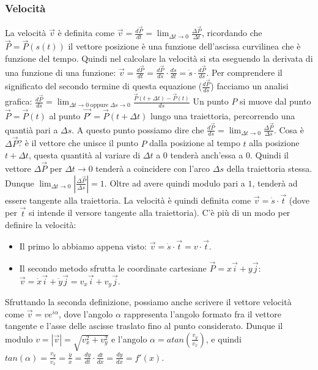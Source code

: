 \subsubsection{Velocità}
La velocità $\vec{v}$ è definita come $\vec{v} = \frac{d \vec{P}}{dt} = \lim_{\Delta t\rightarrow 0} \frac{\Delta \vec{P}}{\Delta t}$, ricordando che $\vec{P} = \vec{P}(s(t))$ il vettore posizione è una funzione dell'ascissa curvilinea che è funzione del tempo. Quindi nel calcolare la velocità si sta eseguendo la derivata di una funzione di una funzione: $\vec{v} = \frac{d \vec{P}}{dt} = \frac{d \vec{P}}{ds} \cdot \frac{ds}{dt} = \dot{s} \cdot  \frac{d \vec{P}}{ds}$. Per comprendere il significato del secondo termine di questa equazione ($\frac{d \vec{P}}{ds}$) facciamo un analisi grafica:
$\frac{d \vec{P}}{ds} = \lim_{\Delta t\rightarrow 0 \;\text{oppure}\; \Delta s \rightarrow 0}\frac{\vec{P}(t+\Delta t) - \vec{P}(t)}{ds}$\newline
Un punto $P$ si muove dal punto $\vec{P} = \vec{P}(t)$ al punto $\vec{P'} = \vec{P} (t + \Delta t)$ lungo una traiettoria, percorrendo una quantià pari a $\Delta s$. A questo punto possiamo dire che $\frac{d\vec{P}}{ds} = \lim_{\Delta t\rightarrow 0} \frac{\Delta \vec{P}}{\Delta s}$. Cosa è $\Delta \vec{P}$? è il vettore che unisce il punto $P$ dalla posizione al tempo $t$ alla posizione $t + \Delta t$, questa quantità al variare di $\Delta t$ a $0$ tenderà anch'essa a $0$. Quindi il vettore $\Delta \vec{P}$ per $\Delta t \rightarrow 0$ tenderà a coincidere con l'arco $\Delta s$ della traiettoria stessa. Dunque $\lim_{\Delta t\rightarrow 0} \left|\frac{\Delta \vec{P}}{\Delta s}\right| = 1$. Oltre ad avere quindi modulo pari a $1$, tenderà ad essere tangente alla traiettoria.\newline
La velocità è quindi definita come $\vec{v} = \dot{s} \cdot \vec{t}$ (dove per $\vec{t}$ si intende il versore tangente alla traiettoria).\newline
C'è più di un modo per definire la velocità:
\begin{itemize}
    \item Il primo lo abbiamo appena visto: $\vec{v} = \dot{s} \cdot \vec{t} = v \cdot \vec{t}$.
    \item Il secondo metodo sfrutta le coordinate cartesiane $\vec{P} = x \vec{i} + y \vec{j}$: $\vec{v} = \dot{x} \vec{i} + \dot{y} \vec{j} = v_x \vec{i} + v_y \vec{j}$.
\end{itemize}
Sfruttando la seconda definizione, possiamo anche scrivere il vettore velocità come $\vec{v} = v e^{i \alpha}$, dove l'angolo $\alpha$ rappresenta l'angolo formato fra il vettore tangente e l'asse delle ascisse traslato fino al punto considerato. Dunque il modulo $v = |\vec{v}| = \sqrt{v_x^2 +v_y^2}$ e l'angolo $\alpha = atan\left(\frac{v_y}{v_x}\right)$, e quindi $tan(\alpha) = \frac{v_y}{v_x} = \frac{\dot{y}}{\dot{x}} = \frac{dy}{dt} \cdot \frac{dt}{dx} = \frac{dy}{dx} = f'(x)$.
